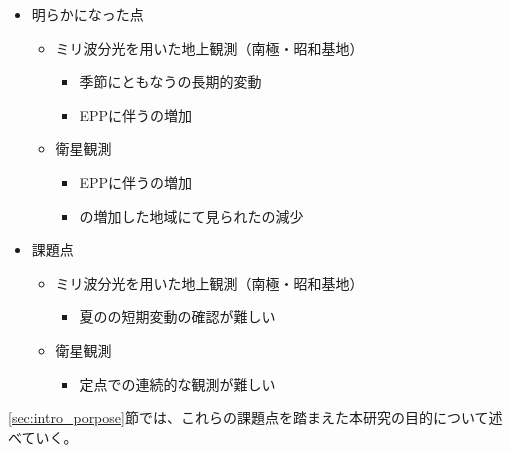 \begin{itemize}
    \item 明らかになった点
    \begin{itemize}
        \item ミリ波分光を用いた地上観測（南極・昭和基地）
        \begin{itemize}
            \item 季節にともなうの長期的変動
            \item EPPに伴うの増加
        \end{itemize}
        \item 衛星観測
        \begin{itemize}
            \item EPPに伴うの増加
            \item {}の増加した地域にて見られたの減少
        \end{itemize}
    \end{itemize}
    \item 課題点
    \begin{itemize}
        \item ミリ波分光を用いた地上観測（南極・昭和基地）
        \begin{itemize}
            \item 夏のの短期変動の確認が難しい
        \end{itemize}
        \item 衛星観測
        \begin{itemize}
            \item 定点での連続的な観測が難しい
        \end{itemize}
    \end{itemize}
\end{itemize}
\ref{sec:intro_porpose}節では、これらの課題点を踏まえた本研究の目的について述べていく。


